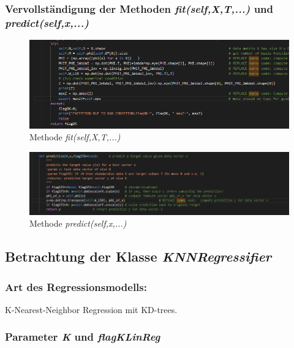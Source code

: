 \subsubsection{ Vervollständigung der Methoden \textit{fit(self,X,T,...)} und \textit{predict(self,x,...)} }

\begin{figure}[H]
    \centering
    \includegraphics[width=1\linewidth]{sections/aufgabe2c_fit.png}
    \caption{Methode \textit{fit(self,X,T,...)}}
\end{figure}

\begin{figure}[H]
    \centering
    \includegraphics[width=1\linewidth]{sections/aufgabe2c_predict.png}
    \caption{Methode \textit{predict(self,x,...)}}
\end{figure}

\subsection{
    Betrachtung der Klasse \textit{KNNRegressifier}
}

\subsubsection{ Art des Regressionsmodells: }

\noindent
 \vspace{0px}
K-Nearest-Neighbor Regression mit KD-trees. 

\subsubsection{ Parameter \textit{K} und \textit{flagKLinReg} }

